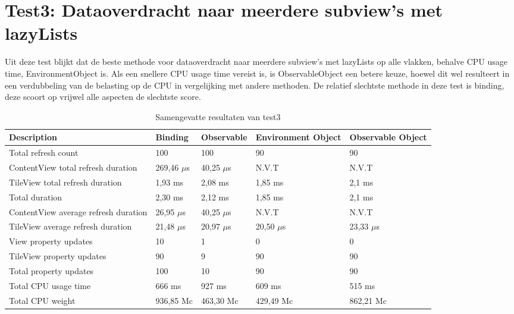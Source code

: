\section{Test3: Dataoverdracht naar meerdere subview's met lazyLists}
Uit deze test blijkt dat de beste methode voor dataoverdracht naar meerdere subview's met lazyLists op alle vlakken, behalve CPU usage time, EnvironmentObject is. Als een snellere CPU usage time vereist is, is ObservableObject een betere keuze, hoewel dit wel resulteert in een verdubbeling van de belasting op de CPU in vergelijking met andere methoden. De relatief slechtste methode in deze test is binding, deze scoort op vrijwel alle aspecten de slechtste score.  
\begin{table}[h!]
    \centering
     \begin{tabularx}{\textwidth}{|>{\raggedright\arraybackslash}m{5cm}|X|X|X|X|}
        \hline
        \textbf{Description} & \textbf{Binding} & \textbf{Observable} & \textbf{Environment Object} & \textbf{Observable Object} \\ 
        \hline
        Total refresh count & \cellcolor{red!50}100 & \cellcolor{red!50}100 & \cellcolor{green!50}90 & \cellcolor{green!50}90 \\ 
        \hline
        ContentView total refresh duration & 269,46 \(\mu\)s & 40,25 \(\mu\)s & N.V.T & N.V.T \\ 
        \hline
        TileView total refresh duration & 1,93 ms & 2,08 ms & 1,85 ms & 2,1 ms \\ 
        \hline
        Total duration & \cellcolor{red!50}2,30 ms & 2,12 ms & \cellcolor{green!50}1,85 ms & 2,1 ms \\ 
        \hline
        ContentView average refresh duration & 26,95 \(\mu\)s & 40,25 \(\mu\)s & N.V.T & N.V.T \\ 
        \hline
        TileView average refresh duration & 21,48 \(\mu\)s & 20,97 \(\mu\)s & 20,50 \(\mu\)s & 23,33 \(\mu\)s \\ 
        \hline
        View property updates & 10 & 1 & 0 & 0 \\ 
        \hline
        TileView property updates & 90 & 9 & 90 & 90 \\ 
        \hline
        Total property updates & \cellcolor{red!50}100 & \cellcolor{green!50}10 & 90 & 90 \\ 
        \hline
        Total CPU usage time & 666 ms & \cellcolor{red!50}927 ms & 609 ms & \cellcolor{green!50}515 ms \\ 
        \hline
        Total CPU weight & \cellcolor{red!50}936,85 Mc & 463,30 Mc & \cellcolor{green!50}429,49 Mc & 862,21 Mc \\ 
        \hline
    \end{tabularx}
    \caption{Samengevatte resultaten van test3}
    \label{table:summary2}
\end{table}

